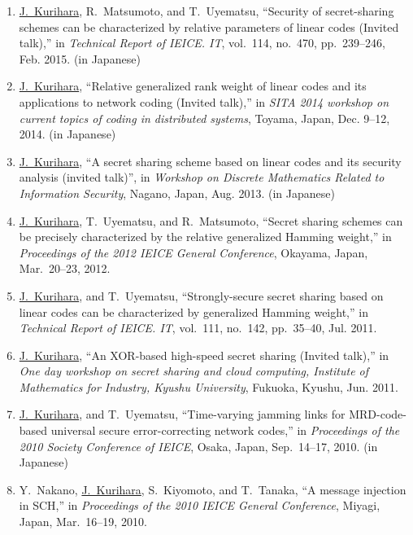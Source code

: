 \begin{enumerate}
 \item \underline{J.~Kurihara}, R.~Matsumoto, and T.~Uyematsu, ``Security of secret-sharing schemes can be characterized by relative parameters of linear codes (Invited talk),'' in \textit{Technical Report of IEICE. IT}, vol.~114, no.~470, pp.~239--246, Feb. 2015. (in Japanese)
 \item \underline{J.~Kurihara}, ``Relative generalized rank weight of linear codes and its applications to network coding (Invited talk),'' in \textit{SITA 2014 workshop on current topics of coding in distributed systems}, Toyama, Japan, Dec. 9--12, 2014. (in Japanese)
 \item \underline{J.~Kurihara}, ``A secret sharing scheme based on linear codes and its security analysis (invited talk)'', in \textit{Workshop on Discrete Mathematics Related to Information Security}, Nagano, Japan, Aug. 2013. (in Japanese)
 \item \underline{J.~Kurihara}, T.~Uyematsu, and R.~Matsumoto,
       ``Secret sharing schemes can be precisely
       characterized by the relative generalized Hamming weight,''
       in \textit{Proceedings of the 2012 IEICE General Conference},
       Okayama, Japan, Mar.~20--23, 2012.
 \item \underline{J.~Kurihara}, and T.~Uyematsu, ``Strongly-secure secret
       sharing based on linear codes can be characterized by generalized
       Hamming weight,'' in \textit{Technical Report of IEICE. IT},
       vol.~111, no.~142, pp.~35--40, Jul. 2011.
 \item \underline{J.~Kurihara}, ``An XOR-based high-speed secret sharing (Invited talk),'' in \textit{One day workshop on secret sharing and cloud computing, Institute of Mathematics for Industry, Kyushu University}, Fukuoka, Kyushu, Jun. 2011.
 \item \underline{J.~Kurihara}, and T.~Uyematsu, ``Time-varying jamming links for MRD-code-based universal secure error-correcting network codes,'' in \textit{Proceedings of the 2010 Society Conference of IEICE}, Osaka, Japan, Sep.~14--17, 2010. (in Japanese)
 \item Y.~Nakano, \underline{J.~Kurihara}, S.~Kiyomoto, and T.~Tanaka, ``A message injection in SCH,'' in \textit{Proceedings of the 2010 IEICE General Conference}, Miyagi, Japan, Mar.~16--19, 2010.


\end{enumerate}
